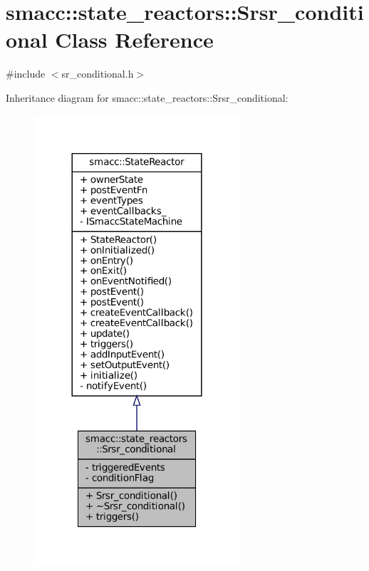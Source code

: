 \hypertarget{classsmacc_1_1state__reactors_1_1Srsr__conditional}{}\section{smacc\+:\+:state\+\_\+reactors\+:\+:Srsr\+\_\+conditional Class Reference}
\label{classsmacc_1_1state__reactors_1_1Srsr__conditional}


{\ttfamily \#include $<$sr\+\_\+conditional.\+h$>$}



Inheritance diagram for smacc\+:\+:state\+\_\+reactors\+:\+:Srsr\+\_\+conditional\+:
\nopagebreak
\begin{figure}[H]
\begin{center}
\leavevmode
\includegraphics[width=216pt]{classsmacc_1_1state__reactors_1_1Srsr__conditional__inherit__graph}
\end{center}
\end{figure}


